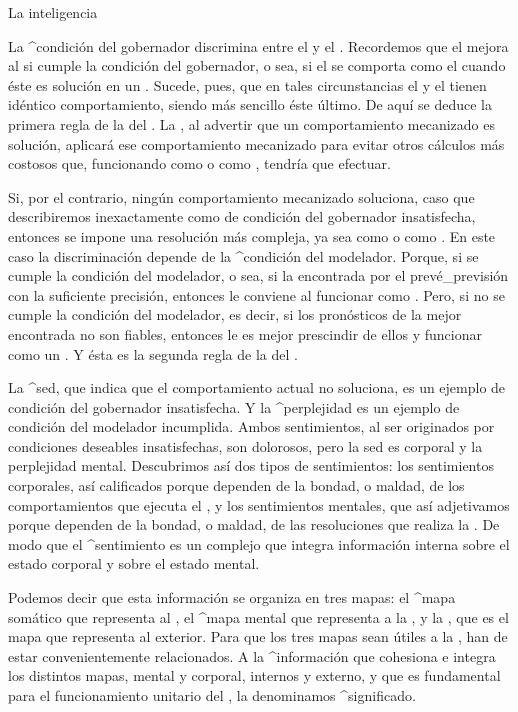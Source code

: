 \Section La inteligencia

La ^{condición del gobernador} discrimina entre el {\mecanismo} y el
{\adaptador}. Recordemos que el {\adaptador} mejora al {\mecanismo} si
cumple la condición del gobernador, o sea, si el {\adaptador} se
comporta como el {\mecanismo} cuando éste es solución en un {\universo}.
Sucede, pues, que en tales circunstancias el {\adaptador} y el
{\mecanismo} tienen idéntico comportamiento, siendo más sencillo éste
último. De aquí se deduce la primera regla de la {\inteligencia} del
{\conocedor}. La {\inteligencia}, al advertir que un comportamiento
mecanizado es solución, aplicará ese comportamiento \hbox{mecanizado}
para evitar otros cálculos más costosos que, funcionando como
{\adaptador} o como {\aprendiz}, tendría que efectuar.

Si, por el contrario, ningún comportamiento mecanizado soluciona, caso
que describiremos inexactamente como de condición del gobernador
insatisfecha, entonces se impone una resolución más compleja, ya sea
como {\adaptador} o como {\aprendiz}. En este caso la discriminación
depende de la ^{condición del modelador}. Porque, si se cumple la
condición del modelador, o sea, si la {\realidad} encontrada por el
{\modelador} prevé_{previsión} con la suficiente precisión, entonces le
conviene al {\conocedor} funcionar como {\aprendiz}. Pero, si no se
cumple la condición del modelador, es decir, si los pronósticos de la
mejor {\realidad} encontrada no son fiables, entonces le es mejor
prescindir de ellos y funcionar como un {\adaptador}. Y ésta es la
segunda regla de la {\inteligencia} del {\conocedor}.

La ^{sed}, que indica que el comportamiento actual no soluciona, es un
ejemplo de condición del gobernador insatisfecha. Y la ^{perplejidad} es
un ejemplo de condición del modelador incumplida. Ambos sentimientos, al
ser originados por condiciones deseables insatisfechas, son dolorosos,
pero la sed es corporal y la perplejidad mental. Descubrimos así dos
tipos de sentimientos: los sentimientos corporales, así calificados
porque dependen de la bondad, o maldad, de los comportamientos que
ejecuta el {\cuerpo}, y los sentimientos mentales, que así adjetivamos
porque dependen de la bondad, o maldad, de las resoluciones que realiza
la {\mente}. De modo que el ^{sentimiento} es un complejo que integra
información interna sobre el estado corporal y sobre el estado mental.

Podemos decir que esta información se organiza en tres mapas: el ^{mapa
somático} que representa al {\cuerpo}, el ^{mapa mental} que representa
a la {\mente}, y la {\realidad}, que es el mapa que representa al
exterior. Para que los tres mapas sean útiles a la {\inteligencia}, han
de estar convenientemente relacionados. A la ^{información} que
cohesiona e integra los distintos mapas, mental y corporal, internos y
externo, y que es fundamental para el funcionamiento unitario del
{\conocedor}, la denominamos ^{significado}.

